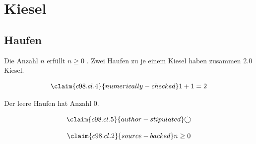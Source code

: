 \chapter{Kiesel}\label{c98}
\section{Haufen}\label{c98.s1}

\begin{theorem}[Anzahl]\label{c98.thm.count}
  Die Anzahl $n$ erfüllt $n \geq 0$ .
  Zwei Haufen zu je einem Kiesel haben zusammen
  \num[c98.cl.4]{2.0}{} Kiesel.
\end{theorem}

\begin{equation}\label{c98.eq.sum}\claim{c98.cl.4}{numerically-checked}
  1 + 1 = 2
\end{equation}

\begin{lemma}[Leer]\label{c98.lem.empty}
  Der leere Haufen hat Anzahl $0$.
\end{lemma}

\begin{equation}\label{c98.eq.circle}\claim{c98.cl.5}{author-stipulated}
  \bigcirc
\end{equation}

\begin{vertiefung}[id=c98.v1, titel={T}, wozu={W}, voraussetzung={V}, zurueck={Z}]
  \begin{equation}\label{c98.eq.page}\claim{c98.cl.2}{source-backed}
    n \geq 0
  \end{equation}
\end{vertiefung}
